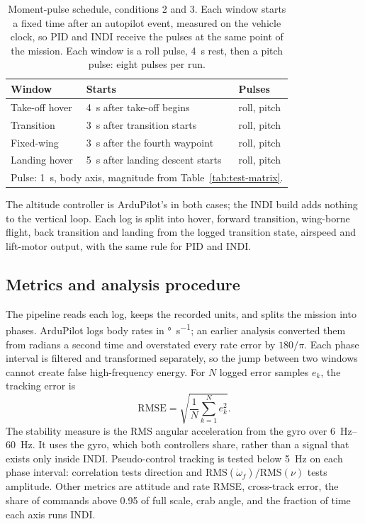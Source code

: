 \documentclass{article}
\begin{document}
\begin{table}[H]
\centering
\caption{Moment-pulse schedule, conditions 2 and 3. Each window starts a fixed time after an autopilot event, measured on the vehicle clock, so PID and INDI receive the pulses at the same point of the mission. Each window is a roll pulse, \SI{4}{\second} rest, then a pitch pulse: eight pulses per run.}
\label{tab:disturbance-points}
\begin{tabular}{lll}
\hline
Window & Starts & Pulses \\
\hline
Take-off hover & \SI{4}{\second} after take-off begins & roll, pitch \\
Transition & \SI{3}{\second} after transition starts & roll, pitch \\
Fixed-wing & \SI{3}{\second} after the fourth waypoint & roll, pitch \\
Landing hover & \SI{5}{\second} after landing descent starts & roll, pitch \\
\hline
\multicolumn{3}{l}{Pulse: \SI{1}{\second}, body axis, magnitude from Table~\ref{tab:test-matrix}.} \\
\hline
\end{tabular}
\end{table}

The altitude controller is ArduPilot's in both cases; the INDI build adds nothing to the vertical loop. Each log is split into hover, forward transition, wing-borne flight, back transition and landing from the logged transition state, airspeed and lift-motor output, with the same rule for PID and INDI.

\subsection{Metrics and analysis procedure}
\label{sec:metrics}
The pipeline reads each log, keeps the recorded units, and splits the mission into phases. ArduPilot logs body rates in \si{\degree\per\second}; an earlier analysis converted them from radians a second time and overstated every rate error by $180/\pi$. Each phase interval is filtered and transformed separately, so the jump between two windows cannot create false high-frequency energy. For $N$ logged error samples $e_k$, the tracking error is
\begin{equation}
    \mathrm{RMSE}=\sqrt{\frac{1}{N}\sum_{k=1}^{N} e_k^2}.
    \label{eq:rmse}
\end{equation}
The stability measure is the RMS angular acceleration from the gyro over \SIrange{6}{60}{\hertz}. It uses the gyro, which both controllers share, rather than a signal that exists only inside INDI. Pseudo-control tracking is tested below \SI{5}{\hertz} on each phase interval: correlation tests direction and $\mathrm{RMS}(\dot\omega_f)/\mathrm{RMS}(\nu)$ tests amplitude. Other metrics are attitude and rate RMSE, cross-track error, the share of commands above 0.95 of full scale, crab angle, and the fraction of time each axis runs INDI.
\end{document}

